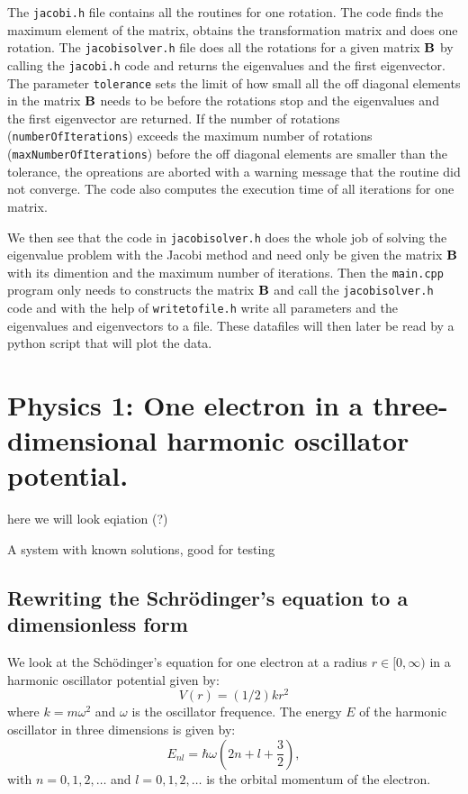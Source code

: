 \documentclass[11pt,a4wide]{article}
\begin{document}
The \texttt{jacobi.h} file contains all the routines for one rotation. The code finds the maximum element of the matrix, obtains the transformation matrix and does one rotation. The \texttt{jacobisolver.h} file does all the rotations for a given matrix $\bf B$ by calling the \texttt{jacobi.h} code and returns the eigenvalues and the first eigenvector. The parameter \texttt{tolerance} sets the limit of how small all the off diagonal elements in the matrix $\bf B$ needs to be before the rotations stop and the eigenvalues and the first eigenvector are returned. If the number of rotations (\texttt{numberOfIterations}) exceeds the maximum number of rotations (\texttt{maxNumberOfIterations}) before the off diagonal elements are smaller than the tolerance, the opreations are aborted with a warning message that the routine did not converge. The code also computes the execution time of all iterations for one matrix. 

We then see that the code in \texttt{jacobisolver.h} does the whole job of solving the eigenvalue problem with the Jacobi method and need only be given the matrix $\bf B$ with its dimention and the maximum number of iterations. Then the \texttt{main.cpp} program only needs to constructs the matrix $\bf B$ and call the \texttt{jacobisolver.h} code and with the help of \texttt{writetofile.h} write all parameters and the eigenvalues and eigenvectors to a file. These datafiles will then later be read by a python script that will plot the data. 




\section{Physics 1: One electron in a three-dimensional harmonic oscillator potential.}
here we will look eqiation (?)

A system with known solutions, good for testing
\subsection{Rewriting the Schr\"odinger's equation to a dimensionless form} \label{sec:rewrite_sch}
We look at the Sch\"odinger's equation for one electron at a radius $r\in [0,\infty)$ in a harmonic oscillator potential given by: 
\[
V(r)= (1/2)kr^2
\]
where $k=m\omega^2$ and $\omega$ is the oscillator frequence. The energy $E$ of the harmonic oscillator in three dimensions is given by:
\[
E_{nl}=  \hbar \omega \left(2n+l+\frac{3}{2}\right),
\]
with $n=0,1,2,\dots$ and $l=0,1,2,\dots$ is the orbital momentum of the electron. 
\end{document}
